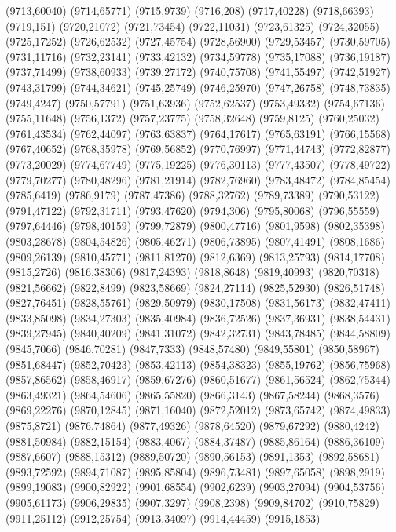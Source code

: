 (9713,60040)
(9714,65771)
(9715,9739)
(9716,208)
(9717,40228)
(9718,66393)
(9719,151)
(9720,21072)
(9721,73454)
(9722,11031)
(9723,61325)
(9724,32055)
(9725,17252)
(9726,62532)
(9727,45754)
(9728,56900)
(9729,53457)
(9730,59705)
(9731,11716)
(9732,23141)
(9733,42132)
(9734,59778)
(9735,17088)
(9736,19187)
(9737,71499)
(9738,60933)
(9739,27172)
(9740,75708)
(9741,55497)
(9742,51927)
(9743,31799)
(9744,34621)
(9745,25749)
(9746,25970)
(9747,26758)
(9748,73835)
(9749,4247)
(9750,57791)
(9751,63936)
(9752,62537)
(9753,49332)
(9754,67136)
(9755,11648)
(9756,1372)
(9757,23775)
(9758,32648)
(9759,8125)
(9760,25032)
(9761,43534)
(9762,44097)
(9763,63837)
(9764,17617)
(9765,63191)
(9766,15568)
(9767,40652)
(9768,35978)
(9769,56852)
(9770,76997)
(9771,44743)
(9772,82877)
(9773,20029)
(9774,67749)
(9775,19225)
(9776,30113)
(9777,43507)
(9778,49722)
(9779,70277)
(9780,48296)
(9781,21914)
(9782,76960)
(9783,48472)
(9784,85454)
(9785,6419)
(9786,9179)
(9787,47386)
(9788,32762)
(9789,73389)
(9790,53122)
(9791,47122)
(9792,31711)
(9793,47620)
(9794,306)
(9795,80068)
(9796,55559)
(9797,64446)
(9798,40159)
(9799,72879)
(9800,47716)
(9801,9598)
(9802,35398)
(9803,28678)
(9804,54826)
(9805,46271)
(9806,73895)
(9807,41491)
(9808,1686)
(9809,26139)
(9810,45771)
(9811,81270)
(9812,6369)
(9813,25793)
(9814,17708)
(9815,2726)
(9816,38306)
(9817,24393)
(9818,8648)
(9819,40993)
(9820,70318)
(9821,56662)
(9822,8499)
(9823,58669)
(9824,27114)
(9825,52930)
(9826,51748)
(9827,76451)
(9828,55761)
(9829,50979)
(9830,17508)
(9831,56173)
(9832,47411)
(9833,85098)
(9834,27303)
(9835,40984)
(9836,72526)
(9837,36931)
(9838,54431)
(9839,27945)
(9840,40209)
(9841,31072)
(9842,32731)
(9843,78485)
(9844,58809)
(9845,7066)
(9846,70281)
(9847,7333)
(9848,57480)
(9849,55801)
(9850,58967)
(9851,68447)
(9852,70423)
(9853,42113)
(9854,38323)
(9855,19762)
(9856,75968)
(9857,86562)
(9858,46917)
(9859,67276)
(9860,51677)
(9861,56524)
(9862,75344)
(9863,49321)
(9864,54606)
(9865,55820)
(9866,3143)
(9867,58244)
(9868,3576)
(9869,22276)
(9870,12845)
(9871,16040)
(9872,52012)
(9873,65742)
(9874,49833)
(9875,8721)
(9876,74864)
(9877,49326)
(9878,64520)
(9879,67292)
(9880,4242)
(9881,50984)
(9882,15154)
(9883,4067)
(9884,37487)
(9885,86164)
(9886,36109)
(9887,6607)
(9888,15312)
(9889,50720)
(9890,56153)
(9891,1353)
(9892,58681)
(9893,72592)
(9894,71087)
(9895,85804)
(9896,73481)
(9897,65058)
(9898,2919)
(9899,19083)
(9900,82922)
(9901,68554)
(9902,6239)
(9903,27094)
(9904,53756)
(9905,61173)
(9906,29835)
(9907,3297)
(9908,2398)
(9909,84702)
(9910,75829)
(9911,25112)
(9912,25754)
(9913,34097)
(9914,44459)
(9915,1853)
